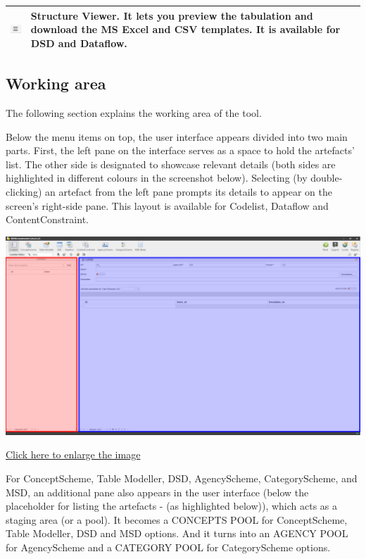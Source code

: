 \documentclass[
]{book}
\theoremstyle{definition}
\theoremstyle{definition}
\theoremstyle{definition}
\theoremstyle{definition}
\theoremstyle{remark}
\begin{document}
\begin{longtable}[]{@{}
  >{\raggedright\arraybackslash}p{}
  >{\raggedright\arraybackslash}p{}@{}}
\includegraphics{images/image039.png} & Structure Viewer. It lets you preview the tabulation and download the MS Excel and CSV templates. It is available for DSD and Dataflow. \\
\bottomrule()
\end{longtable}

\hypertarget{working-area}{%
\subsection{Working area}\label{working-area}}

The following section explains the working area of the tool.

Below the menu items on top, the user interface appears divided into two main parts. First, the left pane on the interface serves as a space to hold the artefacts' list. The other side is designated to showcase relevant details (both sides are highlighted in different colours in the screenshot below). Selecting (by double-clicking) an artefact from the left pane prompts its details to appear on the screen's right-side pane. This layout is available for Codelist, Dataflow and ContentConstraint.

\begin{center}\includegraphics[width=1\linewidth]{./images/image040} \end{center}

\href{images/image040.png}{Click here to enlarge the image}

For ConceptScheme, Table Modeller, DSD, AgencyScheme, CategoryScheme, and MSD, an additional pane also appears in the user interface (below the placeholder for listing the artefacts - (as highlighted below)), which acts as a staging area (or a pool). It becomes a CONCEPTS POOL for ConceptScheme, Table Modeller, DSD and MSD options. And it turns into an AGENCY POOL for AgencyScheme and a CATEGORY POOL for CategoryScheme options.
\end{document}
